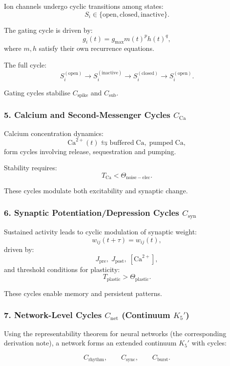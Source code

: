 Ion channels undergo cyclic transitions among states:
\[
  S_i \in \{\mathrm{open}, \mathrm{closed}, \mathrm{inactive}\}.
\]

The gating cycle is driven by:
\[
  g_i(t) = g_{\mathrm{max}} m(t)^p h(t)^q,
\]
where $m,h$ satisfy their own recurrence equations.

The full cycle:
\[
  S_i^{(\mathrm{open})}
  \to 
  S_i^{(\mathrm{inactive})}
  \to
  S_i^{(\mathrm{closed})}
  \to
  S_i^{(\mathrm{open})}.
\]

Gating cycles stabilise $C_{\mathrm{spike}}$ and $C_{\mathrm{sub}}$.

\subsubsection{5. Calcium and Second-Messenger Cycles $C_{\mathrm{Ca}}$}

Calcium concentration dynamics:
\[
  \mathrm{Ca}^{2+}(t)
  \leftrightarrows
  \mathrm{buffered\; Ca},\;
  \mathrm{pumped\; Ca},
\]
form cycles involving release, sequestration and pumping.

Stability requires:
\[
  T_{\mathrm{Ca}} < \Theta_{\mathrm{noise-elec}}.
\]

These cycles modulate both excitability and synaptic change.

\subsubsection{6. Synaptic Potentiation/Depression Cycles $C_{\mathrm{syn}}$}

Sustained activity leads to cyclic modulation of synaptic weight:
\[
  w_{ij}(t+\tau) = w_{ij}(t),
\]
driven by:
\[
  J_{\mathrm{pre}},\; J_{\mathrm{post}},\; [\mathrm{Ca}^{2+}],
\]
and threshold conditions for plasticity:
\[
  T_{\mathrm{plastic}} > \Theta_{\mathrm{plastic}}.
\]

These cycles enable memory and persistent patterns.

\subsubsection{7. Network-Level Cycles $C_{\mathrm{net}}$ (Continuum $K_5'$)}

Using the representability theorem for neural networks (the corresponding derivation note),
a network forms an extended continuum $K_5'$ with cycles:

\[
  C_{\mathrm{rhythm}},
  \qquad
  C_{\mathrm{sync}},
  \qquad
  C_{\mathrm{burst}}.
\]

